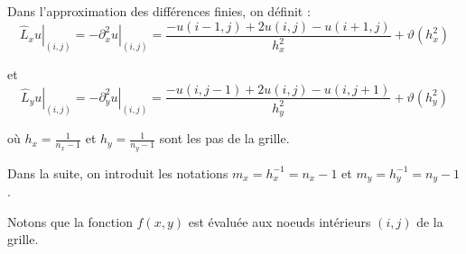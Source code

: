 \documentclass{article}
\begin{document}
 Dans l'approximation des différences finies, on définit :
 \begin{equation}
  \left. \hat{ L}_x u \right|_{(i,j)}=\left. -\partial_x^2 u \right|_{(i,j)} = \frac{-u(i-1,j)+2 u(i,j)-u(i+1,j)}{h_x^2}
+ \vartheta(h_x^2)
\end{equation}

 et 
  \begin{equation}
  \left. \hat{L}_y u  \right|_{(i,j)}=\left. -\partial_y^2 u  \right|_{(i,j)}=  \frac{-u(i,j-1)+2 u(i,j)-u(i,j+1)}{h_y^2} + \vartheta(h_y^2)
  \end{equation}
 
 où $h_x=\frac{1}{n_x-1}$ et $h_y=\frac{1}{n_y-1}$ sont les pas de la grille.
 
 Dans la suite, on introduit les notations $m_x =h_x^{-1} = n_x-1$ et $m_y=h_y^{-1}=n_y -1$.

Notons que la fonction $f(x,y)$ est évaluée aux noeuds intérieurs $(i,j)$ de la grille. 


 
\end{document}
